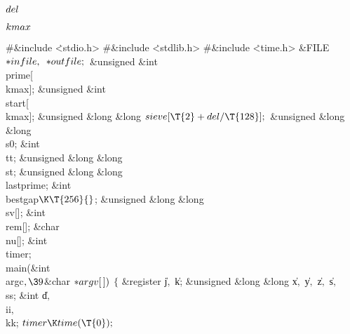 \Y\B\4\D$\\{del}$ \5
\par
\B\4\D$\\{kmax}$ \5
\par
\Y\B\8\#\&{include} \.{<stdio.h>}\6
\8\#\&{include} \.{<stdlib.h>}\6
\8\#\&{include} \.{<time.h>}\6
\&{FILE} ${}{*}\\{infile},{}$ ${}{*}\\{outfile};{}$\6
\&{unsigned} \&{int} \\{prime}[\\{kmax}];\6
\&{unsigned} \&{int} \\{start}[\\{kmax}];\6
\&{unsigned} \&{long} \&{long} ${}\\{sieve}[\T{2}+\\{del}/\T{128}];{}$\6
\&{unsigned} \&{long} \&{long} \\{s0};\6
\&{int} \\{tt};\6
\&{unsigned} \&{long} \&{long} \\{st};\6
\&{unsigned} \&{long} \&{long} \\{lastprime};%
\6
\&{int} \\{bestgap}${}\K\T{256}{}$;\6
\&{unsigned} \&{long} \&{long} \\{sv}[];\6
\&{int} \\{rem}[];\6
\&{char} \\{nu}[];\6
\&{int} \\{timer};\7
\\{main}(\&{int} \\{argc}${},\39{}$\&{char} ${}{*}\\{argv}[\,]){}$\1\1\2\2\6
${}\{{}$\1\6
\&{register} \|j${},{}$ \|k;\6
\&{unsigned} \&{long} \&{long} \|x${},{}$ \|y${},{}$ \|z${},{}$ \|s${},{}$ %
\\{ss};\6
\&{int} \|d${},{}$ \\{ii}${},{}$ \\{kk};\7
${}\\{timer}\K\\{time}(\T{0});{}$\6
